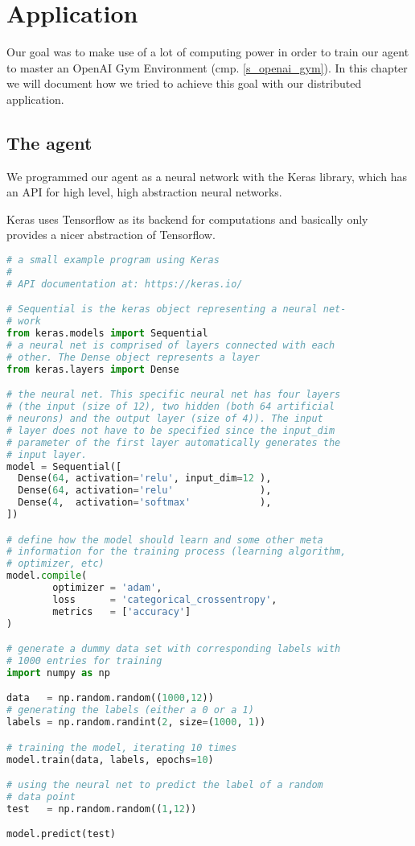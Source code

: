 \section{Application}

Our goal was to make use of a lot of computing power in
order to train our agent to master an OpenAI Gym
Environment (cmp. \ref{s_openai_gym}). In this chapter we
will document how we tried to achieve this goal with our
distributed application.


\subsection{The agent}

We programmed our agent as a neural network with the Keras
library, which has an API for high level, high abstraction
neural networks.

Keras uses Tensorflow as its backend for computations and
basically only provides a nicer abstraction of Tensorflow.

\begin{mdframed}[style=codebox]
\begin{lstlisting}[language=Python]
# a small example program using Keras
#
# API documentation at: https://keras.io/

# Sequential is the keras object representing a neural net-
# work
from keras.models import Sequential
# a neural net is comprised of layers connected with each
# other. The Dense object represents a layer
from keras.layers import Dense

# the neural net. This specific neural net has four layers
# (the input (size of 12), two hidden (both 64 artificial
# neurons) and the output layer (size of 4)). The input
# layer does not have to be specified since the input_dim
# parameter of the first layer automatically generates the
# input layer.
model = Sequential([
  Dense(64, activation='relu', input_dim=12 ),
  Dense(64, activation='relu'               ),
  Dense(4,  activation='softmax'            ),
])

# define how the model should learn and some other meta
# information for the training process (learning algorithm,
# optimizer, etc)
model.compile(
        optimizer = 'adam',
        loss      = 'categorical_crossentropy',
        metrics   = ['accuracy']
)

# generate a dummy data set with corresponding labels with
# 1000 entries for training
import numpy as np

data   = np.random.random((1000,12))
# generating the labels (either a 0 or a 1)
labels = np.random.randint(2, size=(1000, 1))

# training the model, iterating 10 times
model.train(data, labels, epochs=10)

# using the neural net to predict the label of a random
# data point
test   = np.random.random((1,12))

model.predict(test)
\end{lstlisting}
\end{mdframed}

